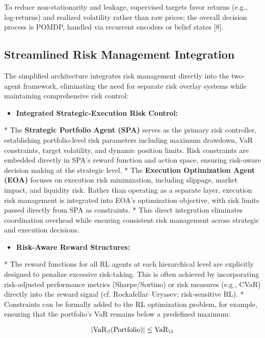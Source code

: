 \documentclass[11pt,a4paper]{article}
\begin{document}
To reduce non-stationarity and leakage, supervised targets favor returns (e.g., log-returns) and realized volatility rather than raw prices; the overall decision process is POMDP, handled via recurrent encoders or belief states [8].

\subsection{Streamlined Risk Management Integration}

The simplified architecture integrates risk management directly into the two-agent framework, eliminating the need for separate risk overlay systems while maintaining comprehensive risk control:

\begin{itemize}
\item   \textbf{Integrated Strategic-Execution Risk Control:}
\end{itemize}
    *   The \textbf{Strategic Portfolio Agent (SPA)} serves as the primary risk controller, establishing portfolio-level risk parameters including maximum drawdown, VaR constraints, target volatility, and dynamic position limits. Risk constraints are embedded directly in SPA's reward function and action space, ensuring risk-aware decision making at the strategic level.
    *   The \textbf{Execution Optimization Agent (EOA)} focuses on execution risk minimization, including slippage, market impact, and liquidity risk. Rather than operating as a separate layer, execution risk management is integrated into EOA's optimization objective, with risk limits passed directly from SPA as constraints.
    *   This direct integration eliminates coordination overhead while ensuring consistent risk management across strategic and execution decisions.

\begin{itemize}
\item   \textbf{Risk-Aware Reward Structures:}
\end{itemize}
    *   The reward functions for all RL agents at each hierarchical level are explicitly designed to penalize excessive risk-taking. This is often achieved by incorporating risk-adjusted performance metrics (Sharpe/Sortino) or risk measures (e.g., CVaR) directly into the reward signal (cf. Rockafellar–Uryasev; risk‑sensitive RL).
    *   Constraints can be formally added to the RL optimization problem, for example, ensuring that the portfolio's VaR remains below a predefined maximum:
    
\begin{equation}
|\text{VaR}_\beta(\text{Portfolio})| \leq \text{VaR}_{\text{\1}}
\end{equation}
\end{document}
